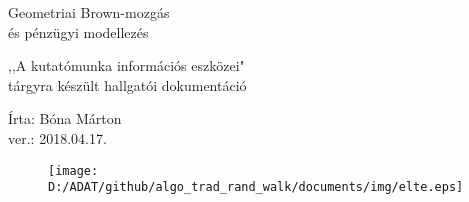 \documentclass[a4paper, 12pt]{article}
\numberwithin{equation}{section}          %
\numberwithin{figure}{subsection}
\begin{document}
	
	\begin{titlepage}   
		
		\begin{center}
			
			\thispagestyle{empty}  
			
			\vspace*{1.5cm}

			{\LARGE Geometriai Brown-mozgás \\ és pénzügyi modellezés }

			\vspace*{1.5cm}
			
			{\small ,,A kutatómunka információs eszközei" \\
				tárgyra készült hallgatói dokumentáció}
			
			\vspace*{1.5cm}

			{\footnotesize Írta: Bóna Márton} \\
			{\footnotesize ver.: 2018.04.17.}
			
			\vspace*{3cm}

			\begin{figure}[h!]
				\begin{center}
					\texttt{[image: D:/ADAT/github/algo\_trad\_rand\_walk/documents/img/elte.eps]}
				\end{center}
			\end{figure}
			
		\end{center}
	
	\end{titlepage}
	
	\newpage
	
	  
	\thispagestyle{empty}
	
	\begin{abstract}
		
		Ezen dokumentum ,,A kutatómunka információs eszközei" tárgyra készített programozási
		eszközök megismerése céljából létrehozott beadandó dokumentációja.
		
		A dokumentum röviden összefoglalja a tárgy elvárását a beadandóval kapcsolatban,
		továbbá ismerteti a kiválasztott probléma alapjait. A feladatot párfős csapatoknak
		kell megoldaniuk, így szó fog esik a csapatmunkáról és a feladatok szétosztásáról.
		Továbbiakban a saját feladatrészem munkafolyamatát és a fejlesztés során adódó problémák
		megoldásáról fogok írni. Végezetül bemutatásra kerül a végeredmény.

	\end{abstract}
	
\end{document}
